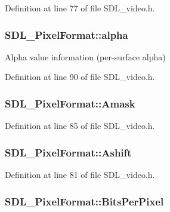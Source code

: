 Definition at line 77 of file S\+D\+L\+\_\+video.\+h.

\hypertarget{struct_s_d_l___pixel_format_a0b0fd9deaec730811212ecdeaa24c7ea}{}
\subsubsection[{alpha}]{ S\+D\+L\+\_\+\+Pixel\+Format\+::alpha}\label{struct_s_d_l___pixel_format_a0b0fd9deaec730811212ecdeaa24c7ea}
Alpha value information (per-\/surface alpha) 

Definition at line 90 of file S\+D\+L\+\_\+video.\+h.

\hypertarget{struct_s_d_l___pixel_format_a6cdaf31f6cb153fefda47fa6b8368c0e}{}
\subsubsection[{Amask}]{ S\+D\+L\+\_\+\+Pixel\+Format\+::\+Amask}\label{struct_s_d_l___pixel_format_a6cdaf31f6cb153fefda47fa6b8368c0e}


Definition at line 85 of file S\+D\+L\+\_\+video.\+h.

\hypertarget{struct_s_d_l___pixel_format_ac3c4ffa0de1f2c94040340deede3bf46}{}
\subsubsection[{Ashift}]{ S\+D\+L\+\_\+\+Pixel\+Format\+::\+Ashift}\label{struct_s_d_l___pixel_format_ac3c4ffa0de1f2c94040340deede3bf46}


Definition at line 81 of file S\+D\+L\+\_\+video.\+h.

\hypertarget{struct_s_d_l___pixel_format_aac533fae3043ef44df01108248e111d8}{}
\subsubsection[{Bits\+Per\+Pixel}]{ S\+D\+L\+\_\+\+Pixel\+Format\+::\+Bits\+Per\+Pixel}\label{struct_s_d_l___pixel_format_aac533fae3043ef44df01108248e111d8}


